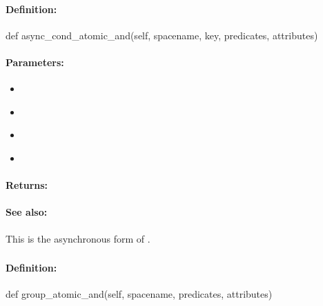 \paragraph{Definition:}
\begin{pythoncode}
def async_cond_atomic_and(self, spacename, key, predicates, attributes)
\end{pythoncode}

\paragraph{Parameters:}
\begin{itemize}[noitemsep]
\item {}\\

\item {}\\

\item {}\\

\item {}\\

\end{itemize}

\paragraph{Returns:}


\paragraph{See also:}  This is the asynchronous form of .

\pagebreak
\subsubsection{}
\label{api:python:group_atomic_and}


\paragraph{Definition:}
\begin{pythoncode}
def group_atomic_and(self, spacename, predicates, attributes)
\end{pythoncode}


